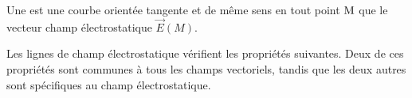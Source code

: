 \documentclass[12pt,fancy]{cours}
\begin{document}
\begin{definition}\label{def:}
  Une  est une courbe orientée tangente et de même sens en tout point $\rm M$ que le vecteur champ électrostatique $\Vec{E}(M)$.
\end{definition}


Les lignes de champ électrostatique vérifient les propriétés suivantes. Deux de ces propriétés sont communes à tous les champs vectoriels, tandis que les deux autres sont spécifiques au champ électrostatique.
\end{document}
